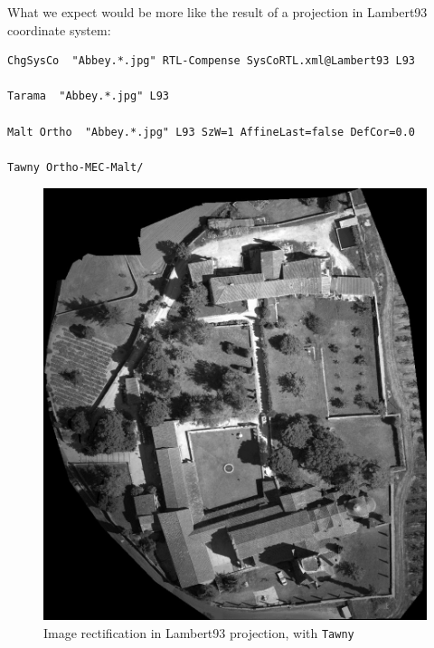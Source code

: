 What we expect would be more like the result of a projection in Lambert93 coordinate system:

\begin{verbatim}
ChgSysCo  "Abbey.*.jpg" RTL-Compense SysCoRTL.xml@Lambert93 L93

Tarama  "Abbey.*.jpg" L93

Malt Ortho  "Abbey.*.jpg" L93 SzW=1 AffineLast=false DefCor=0.0

Tawny Ortho-MEC-Malt/
\end{verbatim}

\begin{figure}[H]
\begin{center}
\includegraphics[width=160mm]{FIGS/Cuxa/L93-Ortho-Eg-Test-Redr.jpg}
\caption{Image rectification in Lambert93 projection, with {\tt Tawny}}
\end{center}
\end{figure}

